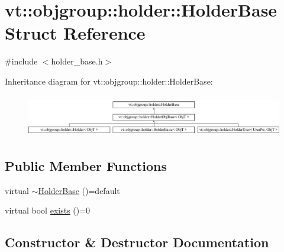 \hypertarget{structvt_1_1objgroup_1_1holder_1_1_holder_base}{}\section{vt\+:\+:objgroup\+:\+:holder\+:\+:Holder\+Base Struct Reference}
\label{structvt_1_1objgroup_1_1holder_1_1_holder_base}


{\ttfamily \#include $<$holder\+\_\+base.\+h$>$}

Inheritance diagram for vt\+:\+:objgroup\+:\+:holder\+:\+:Holder\+Base\+:\begin{figure}[H]
\begin{center}
\leavevmode
\includegraphics[height=1.866667cm]{structvt_1_1objgroup_1_1holder_1_1_holder_base}
\end{center}
\end{figure}
\subsection*{Public Member Functions}
\begin{DoxyCompactItemize}
\item 
virtual \hyperlink{structvt_1_1objgroup_1_1holder_1_1_holder_base_a9388d2780a5ffa01677c3c535d42fbfa}{$\sim$\+Holder\+Base} ()=default
\item 
virtual bool \hyperlink{structvt_1_1objgroup_1_1holder_1_1_holder_base_afeebbe358baf0b2bfea57f52807be564}{exists} ()=0
\end{DoxyCompactItemize}


\subsection{Constructor \& Destructor Documentation}
\mbox{\label{structvt_1_1objgroup_1_1holder_1_1_holder_base_a9388d2780a5ffa01677c3c535d42fbfa}} 
